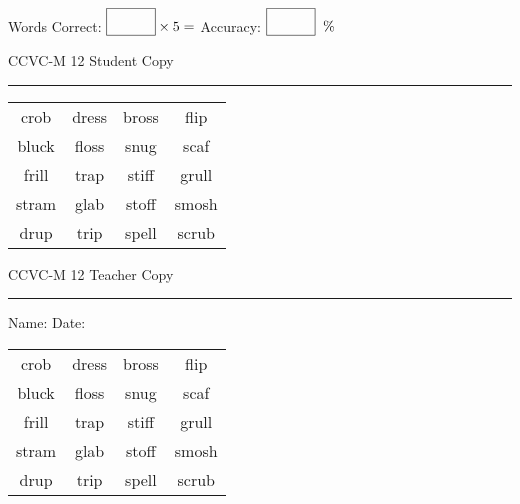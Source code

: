 \documentclass{memoir}
\begin{document}
\small

Words Correct: $\fbox{\phantom{\huge 100}} \times 5 = $ Accuracy: $\fbox{\phantom{\huge 100}}\;\; \%$ 

\vfill

\newpage


\footnotesize \noindent
CCVC-M 12 \hfill Student Copy
\smallskip
\hrule

\Large

\setlength{\tabcolsep}{14pt}
\def\arraystretch{3}

{\selectfont


\begin{vplace}[0.5]
\begin{center}
\begin{tabular}{cccc}
crob & dress & bross       & flip \\
bluck            & floss & snug & scaf \\
frill & trap & stiff & grull            \\
stram & glab & stoff & smosh \\
drup & trip & spell & scrub \\
\end{tabular}
\end{center}
\end{vplace}

}

\newpage

\footnotesize \noindent
CCVC-M 12 \hfill Teacher Copy
\smallskip
\hrule

\small

\vfill

\noindent
Name: \underline{\hspace{1.75in}} \hfill Date: \underline{\hspace{1in}}

\Large

{\selectfont


\begin{vplace}[0.5]
\begin{center}
\begin{tabular}{cccc}
crob & dress & bross       & flip \\
bluck            & floss & snug & scaf \\
frill & trap & stiff & grull            \\
stram & glab & stoff & smosh \\
drup & trip & spell & scrub \\
\end{tabular}
\end{center}
\end{vplace}



}
\end{document}
